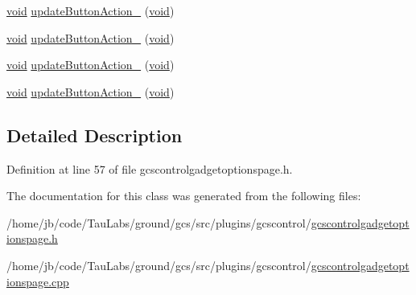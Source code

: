 \begin{DoxyCompactItemize}
\item 
\hyperlink{group___u_a_v_objects_plugin_ga444cf2ff3f0ecbe028adce838d373f5c}{void} \hyperlink{group___g_c_s_control_gadget_plugin_ga667ae55b05e2c319a622450298807d0d}{update\-Button\-Action\-\_} (\hyperlink{group___u_a_v_objects_plugin_ga444cf2ff3f0ecbe028adce838d373f5c}{void})
\item 
\hyperlink{group___u_a_v_objects_plugin_ga444cf2ff3f0ecbe028adce838d373f5c}{void} \hyperlink{group___g_c_s_control_gadget_plugin_ga90dee04d87421e1af638ad7b1dea6aa8}{update\-Button\-Action\-\_} (\hyperlink{group___u_a_v_objects_plugin_ga444cf2ff3f0ecbe028adce838d373f5c}{void})
\item 
\hyperlink{group___u_a_v_objects_plugin_ga444cf2ff3f0ecbe028adce838d373f5c}{void} \hyperlink{group___g_c_s_control_gadget_plugin_ga918d017e724202b8224174985267c978}{update\-Button\-Action\-\_} (\hyperlink{group___u_a_v_objects_plugin_ga444cf2ff3f0ecbe028adce838d373f5c}{void})
\item 
\hyperlink{group___u_a_v_objects_plugin_ga444cf2ff3f0ecbe028adce838d373f5c}{void} \hyperlink{group___g_c_s_control_gadget_plugin_ga9b65e1b928dfafa1fa9d78aaa39c16df}{update\-Button\-Action\-\_} (\hyperlink{group___u_a_v_objects_plugin_ga444cf2ff3f0ecbe028adce838d373f5c}{void})
\end{DoxyCompactItemize}


\subsection{\-Detailed \-Description}


\-Definition at line 57 of file gcscontrolgadgetoptionspage.\-h.



\-The documentation for this class was generated from the following files\-:\begin{DoxyCompactItemize}
\item 
/home/jb/code/\-Tau\-Labs/ground/gcs/src/plugins/gcscontrol/\hyperlink{gcscontrolgadgetoptionspage_8h}{gcscontrolgadgetoptionspage.\-h}\item 
/home/jb/code/\-Tau\-Labs/ground/gcs/src/plugins/gcscontrol/\hyperlink{gcscontrolgadgetoptionspage_8cpp}{gcscontrolgadgetoptionspage.\-cpp}\end{DoxyCompactItemize}
